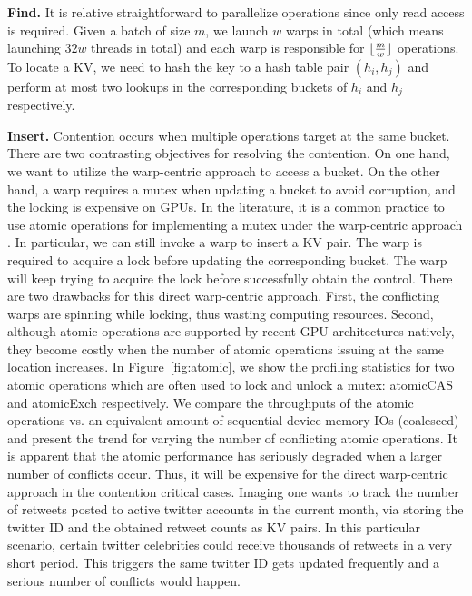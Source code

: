 \vspace{1mm}\noindent\textbf{Find.} It is relative straightforward to parallelize  operations since only read access is required. 
Given a batch of size $m$, we launch $w$ warps in total (which means launching $32w$ threads in total) and each warp is responsible for $\lfloor\frac{m}{w}\rfloor$  operations. To locate a KV, we need to hash the key to a hash table pair $(h_i,h_j)$ and perform at most two lookups in the corresponding buckets of $h_i$ and $h_j$ respectively. 




\vspace{1mm}\noindent\textbf{Insert.} Contention occurs when multiple  operations target at the same bucket. 
There are two contrasting objectives for resolving the contention. On one hand, we want to utilize the warp-centric approach to access a bucket.
On the other hand, a warp requires a mutex when updating a bucket to avoid corruption, and the locking is expensive on GPUs.  
In the literature, it is a common practice to use atomic operations for implementing a mutex under the warp-centric approach \cite{zhang2015mega}. 
In particular, we can still invoke a warp to insert a KV pair. The warp is required to acquire a lock before updating the corresponding bucket. 
The warp will keep trying to acquire the lock before successfully obtain the control. 
There are two drawbacks for this direct warp-centric approach. 
First, the conflicting warps are spinning while locking, thus wasting computing resources.
Second, although atomic operations are supported by recent GPU architectures natively, 
they become costly when the number of atomic operations issuing at the same location increases. 
In Figure~\ref{fig:atomic}, we show the profiling statistics for two atomic operations which are often used to lock and unlock a mutex: atomicCAS and atomicExch respectively. 
We compare the throughputs of the atomic operations vs. an equivalent amount of sequential device memory IOs (coalesced) and present the trend for varying the number of conflicting atomic operations. It is apparent that the atomic performance has seriously degraded when a larger number of conflicts occur. 
Thus, it will be expensive for the direct warp-centric approach in the contention critical cases. 
Imaging one wants to track the number of retweets posted to active twitter accounts in the current month, via storing the twitter ID and the obtained retweet counts as KV pairs. In this particular scenario, certain twitter celebrities could receive thousands of retweets in a very short period. 
This triggers the same twitter ID gets updated frequently and a serious number of conflicts would happen. 




